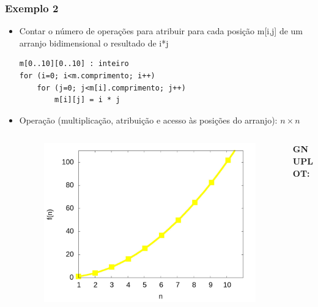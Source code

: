 \documentclass[aspectratio=169]{beamer}
\begin{document}
\begin{frame}[fragile]\frametitle{Exemplo 2}
\begin{itemize}
	\item Contar o número de operações para atribuir para cada posição m[i,j] de um arranjo bidimensional o resultado de i*j
\begin{verbatim}
m[0..10][0..10] : inteiro
for (i=0; i<m.comprimento; i++)
    for (j=0; j<m[i].comprimento; j++)
        m[i][j] = i * j
\end{verbatim}
	\pause
	\item Operação (multiplicação, atribuição e acesso às posições do arranjo): \textbf{$n \times n$}
	\pause
\vspace{-3mm}
\begin{columns}[T]
\begin{column}{0.6\linewidth}
\begin{figure}[h]
	\centering
	\includegraphics[height=0.35\paperheight]{graficos/nxn.jpg}
\end{figure}
\end{column}
\begin{column}{0.4\linewidth}
\vspace{5mm}
{\fontsize{0}{4}\selectfont{}\textbf{GNUPLOT:}

}
\end{column}
\end{columns}
\end{itemize}
\end{frame}
\end{document}

